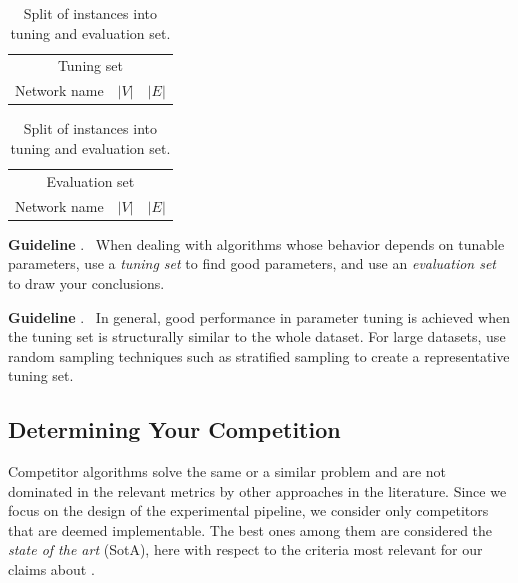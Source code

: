 \documentclass[algorithms,article,submit,moreauthors,pdftex]{Definitions/mdpi}
\newcounter{guideline}
\newcommand{\changed}[1]{#1}
\newcommand{\guideline}[1]{\par\smallskip\textbf{Guideline \theguideline\stepcounter{guideline}}.
\ #1\par\smallskip}
\begin{document}
\begin{table}
\centering
\caption{Split of instances into tuning and evaluation set.}
\label{tab:kadabra_tuning_set}
\footnotesize
\begin{minipage}[t]{0.5\textwidth}
\vspace{0cm} %
\begin{tabular}{lrr}
\toprule
\multicolumn{3}{c}{Tuning set} \\
Network name & $|V|$ & $|E|$ \\
\midrule

\midrule
\midrule
\end{tabular}
\end{minipage}%
\begin{minipage}[t]{0.5\textwidth}
\vspace{0cm} %
\begin{tabular}{lrr}
\toprule
\multicolumn{3}{c}{Evaluation set} \\
Network name & $|V|$ & $|E|$ \\
\midrule

\midrule
\midrule
\end{tabular}
\end{minipage}%
\end{table}

\changed{
\guideline{When dealing with algorithms whose behavior depends on tunable parameters,
use a \emph{tuning set} to find good parameters, and use an \emph{evaluation set}
to draw your conclusions.}
\guideline{In general, good performance in parameter tuning is achieved when the tuning set
is structurally similar to the whole dataset.
For large datasets, use random sampling techniques such as stratified sampling to
create a representative tuning set.}}

\subsection{Determining Your Competition}
\label{sub:competition}

Competitor algorithms solve the same or a similar problem and are not dominated in the relevant
metrics by other approaches in the literature. %
Since we focus on the design of the experimental pipeline, we consider only competitors that
are deemed implementable. The best ones among them are considered the \emph{state of the art} (SotA),
here with respect to the criteria most relevant for our claims about \kad.
\end{document}

